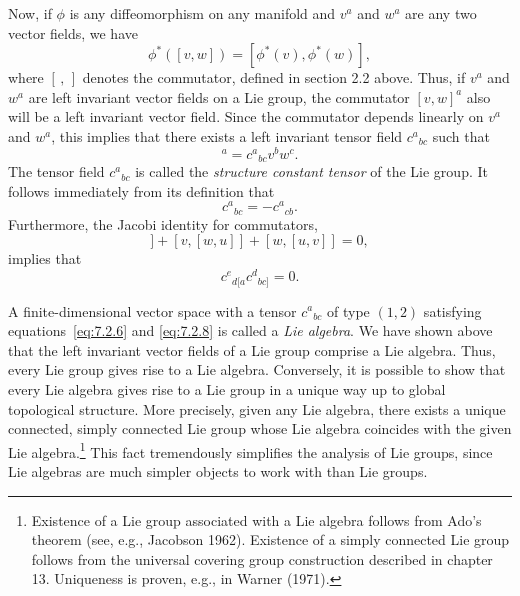 Now, if \(\phi\) is any diffeomorphism on any manifold and \(v^a\) and \(w^a\)
are any two vector fields, we have
\begin{equation}
  \phi^*([v,w])=[\phi^*(v),\phi^*(w)] ,
  \tag{7.2.4}\label{eq:7.2.4}
\end{equation}
where \([\, ,\,]\) denotes the commutator, defined in section 2.2 above. Thus, if
\(v^a\) and \(w^a\) are left invariant vector fields on a Lie group, the
commutator \([v,w]^a\) also will be a left invariant vector field. Since the
commutator depends linearly on \(v^a\) and \(w^a\), this implies that there exists
a left invariant tensor field \(c^a{}_{bc}\) such that
\begin{equation}
  [v,w]^a=c^a{}_{bc}v^bw^c .
  \tag{7.2.5}\label{eq:7.2.5}
\end{equation}
The tensor field \(c^a{}_{bc}\) is called the \emph{structure constant tensor} of the
Lie group. It follows immediately from its definition that
\begin{equation}
  c^a{}_{bc}=-c^a{}_{cb} .
  \tag{7.2.6}\label{eq:7.2.6}
\end{equation}
Furthermore, the Jacobi identity for commutators,
\begin{equation}
  [u,[v,w]]+[v,[w,u]]+[w,[u,v]]=0 ,
  \tag{7.2.7}\label{eq:7.2.7}
\end{equation}
implies that
\begin{equation}
  c^e{}_{d[a}c^d{}_{bc]}=0 .
  \tag{7.2.8}\label{eq:7.2.8}
\end{equation}

A finite-dimensional vector space with a tensor \(c^a{}_{bc}\) of type \((1,2)\)
satisfying equations~\eqref{eq:7.2.6} and \eqref{eq:7.2.8} is called a
\emph{Lie algebra}. We have shown above that the left invariant vector fields of a
Lie group comprise a Lie algebra. Thus, every Lie group gives rise to a Lie algebra.
Conversely, it is possible to show that every Lie algebra gives rise to a Lie group in
a unique way up to global topological structure. More precisely, given any Lie
algebra, there exists a unique connected, simply connected Lie group whose Lie
algebra coincides with the given Lie algebra.\footnote{Existence of a Lie group
associated with a Lie algebra follows from Ado's theorem (see, e.g., Jacobson 1962).
Existence of a simply connected Lie group follows from the universal covering group
construction described in chapter 13. Uniqueness is proven, e.g., in Warner (1971).}
This fact tremendously simplifies the analysis of Lie groups, since Lie algebras are
much simpler objects to work with than Lie groups.

